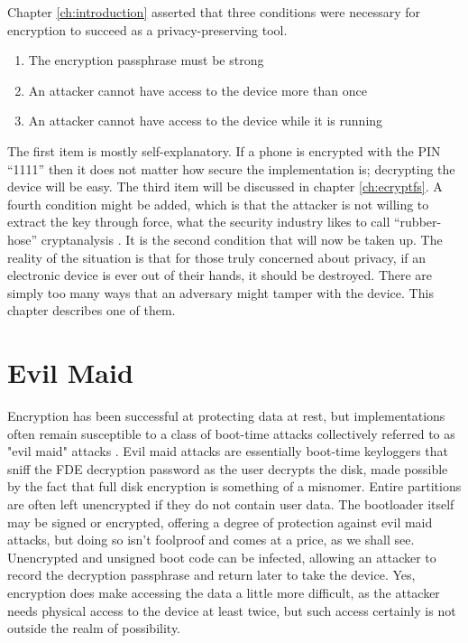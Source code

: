 Chapter \ref{ch:introduction} asserted that three conditions were necessary for encryption to succeed as a privacy-preserving tool.
\begin{enumerate}
	\item{The encryption passphrase must be strong}
	\item{An attacker cannot have access to the device more than once}
	\item{An attacker cannot have access to the device while it is running}
\end{enumerate}
The first item is mostly self-explanatory. If a phone is encrypted with the PIN ``1111'' then it does not matter how secure the
implementation is; decrypting the device will be easy. The third item will be discussed in chapter \ref{ch:ecryptfs}. A fourth
condition might be added, which is that the attacker is not willing to extract the key through force, what the security industry
likes to call ``rubber-hose'' cryptanalysis \cite{rubberhose}. It is the second condition that will now be taken up. The reality of
the situation is that for those truly concerned about privacy, if an electronic device is ever out of their hands, it should be
destroyed. There are simply too many ways that an adversary might tamper with the device. This chapter describes one of them.

\section{Evil Maid}

Encryption has been successful at protecting data at rest, but implementations often remain susceptible to a class of boot-time
attacks collectively referred to as "evil maid" attacks \cite{schneiermaid}.  Evil maid attacks are essentially boot-time keyloggers
that sniff the FDE decryption password as the user decrypts the disk, made possible by the fact that full disk encryption is
something of a misnomer.  Entire partitions are often left unencrypted if they do not contain user data.  The bootloader itself may
be signed or encrypted, offering a degree of protection against evil maid attacks, but doing so isn't foolproof
\cite{attackingbitlocker} and comes at a price, as we shall see.  Unencrypted and unsigned boot code can be infected, allowing an
attacker to record the decryption passphrase and return later to take the device.  Yes, encryption does make accessing the data a
little more difficult, as the attacker needs physical access to the device at least twice, but such access certainly is not outside
the realm of possibility.

